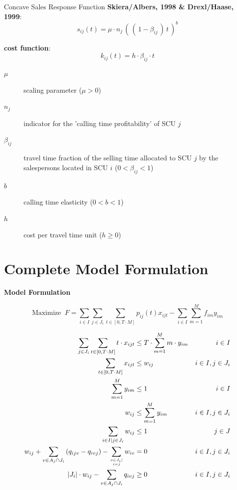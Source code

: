 \documentclass[xcolor=dvipsnames,aspectratio=169, handout, mathserif]{beamer}
\begin{document}
\begin{frame}{Concave Sales Response Function}
\textbf{Skiera/Albers, 1998 \& Drexl/Haase, 1999}:
\begin{equation} \label{sfd-sales-response-function}
s_{ij}(t) = \mu \cdot n_j \, (\, (\, 1- \beta_{ij} \,)\, t\, ) ^ b 
\end{equation}

\textbf{cost function}:
\begin{equation} \label{sfd-cost-function}
k_{ij}(t) = h \cdot \beta_{ij} \cdot t
\end{equation}
\vfill
\begin{description}
    \item[$\mu$]  scaling parameter ($\mu > 0$)
     \item[$n_j$] indicator for the 'calling time profitability' of SCU $j$ 
     \item[$\beta_{ij}$] travel time fraction of the selling time allocated to SCU $j$ 
                    by the salespersons located in SCU $i$
                   ($0 < \beta_{ij} < 1$)
			\item[$b$] calling time elasticity ($0< b < 1$)						
     \item[$h$]     cost per travel time unit ($h \ge 0$)
		\end{description}
\end{frame}
\section{Complete Model Formulation}


\begin{frame}{\textbf{Model Formulation}}

\tiny
\begin{equation}
\text{Maximize } \ F =  \sum_{i \in I} \sum_{j \in J_i} \sum_{t \in [0,T \cdot M]} p_{ij}(t)  x_{ijt} - \sum_{i \in I} \sum_{m=1}^M f_{im} y_{im} 
\end{equation} 

\begin{align}
    \sum_{ j \in J_i} \sum_{t\in [0,T \cdot M]} t \cdot x_{ijt} &\leq T \cdot \sum_{m=1}^M m \cdot y_{im} &i \in I \\
    \sum_{t \in \left[0,T \cdot M \right]}x_{ijt} &\leq w_{ij} &i \in I, j \in J_i \\
    \sum_{m=1}^M y_{im} &\le 1 &i \in I \\
    w_{ij} &\le  \sum_{m = 1}^M y_{im} &i \in I,  j \in J_i \\
    \sum_{i \in I\mid j \in J_i} w_{ij}   &\le 1 &j \in J \label{eq_scuassign} \\
    w_{ij} + \sum_{v \in A_j \cap J_i} \left(q_{ijv} - q_{ivj} \right) - \sum_{v \in J_i \mid \atop i=j} w_{iv} &= 0 &i \in I,  j \in J_i \\
    \left|J_i\right|\cdot w_{ij} - \sum_{v \in A_j \cap J_i} q_{ivj} &\geq 0 &i \in I, j \in J_i 
\end{align}
\normalsize



\end{frame}
\end{document}
